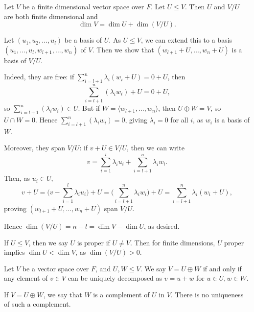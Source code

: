 \documentclass[12pt]{article}
\begin{document}
\begin{proposition}
	Let $V$ be a finite dimensional vector space over $F$. Let $U \leq V$. Then $U$ and $V/U$ are both finite dimensional and
	\[
		\dim V = \dim U + \dim(V/U)
	.\]
\end{proposition}

\begin{proofbox}
	Let $(u_1, u_2, \ldots, u_l)$ be a basis of $U$. As $U \leq V$, we can extend this to a basis $(u_1, \ldots, u_l, w_{l+1}, \ldots, w_{n})$ of $V$. Then we show that $(w_{l+1} + U, \ldots, w_{n} + U)$ is a basis of $V/U$.

	Indeed, they are free: if $\sum_{i = l+1}^{n} \lambda_i (w_i + U) = 0 + U$, then
	\[
	\sum_{i = l+1}^{n} (\lambda_i w_i) + U = 0 + U,
	\]
	so $\sum_{i = l+1}^{n} (\lambda_i w_i) \in U$. But if $W = \langle w_{l+1}, \ldots, w_n\rangle$, then $U \oplus W = V$, so $U \cap W = 0$. Hence $\sum_{i=l+1}^{n} (\lambda_i w_i) = 0$, giving $\lambda_i = 0$ for all $i$, as $w_i$ is a basis of $W$.

	Moreover, they span $V/U$: if $v + U \in V/U$, then we can write
	\[
	v = \sum_{i = 1}^{l} \lambda_i u_i + \sum_{i = l+1}^{n} \lambda_i w_i
	.\]
	Then, as $u_i \in U$,
	\[
	v + U = \Biggl(v - \sum_{i = 1}^{l} \lambda_i u_i \Biggr) + U = \Biggl( \sum_{i = l+1}^{n} \lambda_i w_i\Biggr) + U = \sum_{i = l+1}^{n} \lambda_i (w_i + U)
	,\]
	proving $(w_{l+1} + U, \ldots, w_n + U)$ span $V/U$.

	Hence $\dim(V/U) = n - l = \dim V - \dim U$, as desired.
\end{proofbox}

\begin{remark}
	If $U \leq V$, then we say $U$ is proper if $U \neq V$. Then for finite dimensions, $U$ proper implies $\dim U < \dim V$, as $\dim(V/U) > 0$.
\end{remark}

\begin{definition}
	Let $V$ be a vector space over $F$, and $U, W \leq V$. We say $V = U \oplus W$ if and only if any element of $v \in V$ can be uniquely decomposed as $v = u + w$ for $u \in U, w \in W$.
\end{definition}

\begin{remark}
	If $V = U \oplus W$, we say that $W$ is a complement of $U$ in $V$. There is no uniqueness of such a complement.
\end{remark}
\end{document}
